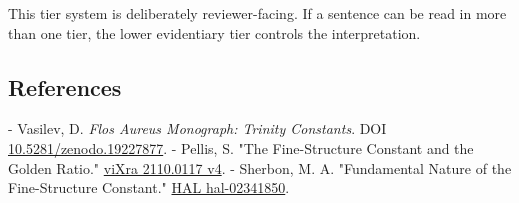   This tier system is deliberately reviewer-facing. If a sentence can be read in more than
  one tier, the lower evidentiary tier controls the interpretation.

\subsection{References}

- Vasilev, D. \textit{Flos Aureus Monograph: Trinity Constants}. DOI \href{https://zenodo.org/doi/10.5281/zenodo.19227877}{10.5281/zenodo.19227877}.
- Pellis, S. "The Fine-Structure Constant and the Golden Ratio." \href{https://vixra.org/pdf/2110.0117v4.pdf}{viXra 2110.0117 v4}.
- Sherbon, M. A. "Fundamental Nature of the Fine-Structure Constant." \href{https://hal.science/hal-02341850/document}{HAL hal-02341850}.
